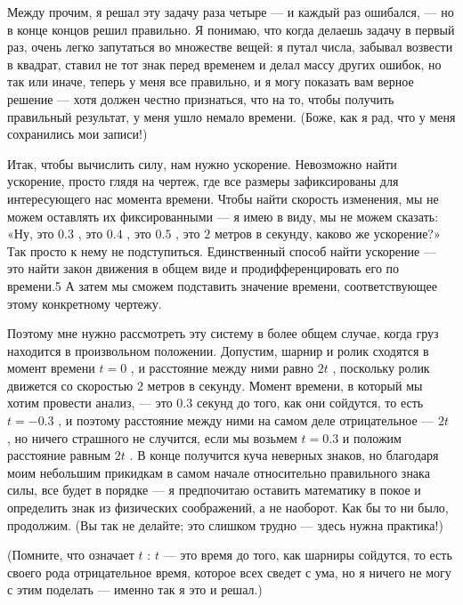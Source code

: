\documentclass[11pt,oneside]{article}
\begin{document}
Между прочим, я решал эту задачу раза четыре --- и каждый раз ошибался, --- но в конце концов решил правильно. Я понимаю, что когда делаешь задачу в первый раз, очень легко запутаться во множестве вещей: я путал числа, забывал возвести в квадрат, ставил не тот знак перед временем и делал массу других ошибок, но так или иначе, теперь у меня все правильно, и я могу показать вам верное решение --- хотя должен честно признаться, что на то, чтобы получить правильный результат, у меня ушло немало времени. (Боже, как я рад, что у меня сохранились мои записи!)\par

Итак, чтобы вычислить силу, нам нужно ускорение. Невозможно найти ускорение, просто глядя на чертеж, где все размеры зафиксированы для интересующего нас момента времени. Чтобы найти скорость изменения, мы не можем оставлять их фиксированными --- я имею в виду, мы не можем сказать: «Ну, это \(0.3\) , это \(0.4\) , это \(0.5\) , это \(2\) метров в секунду, каково же ускорение?» Так просто к нему не подступиться. Единственный способ найти ускорение --- это найти закон движения в общем виде и продифференцировать его по времени.5 А затем мы сможем подставить значение времени, соответствующее этому конкретному чертежу.\par

Поэтому мне нужно рассмотреть эту систему в более общем случае, когда груз находится в произвольном положении. Допустим, шарнир и ролик сходятся в момент времени \(t=0\) , и расстояние между ними равно \(2t\) , поскольку ролик движется со скоростью \(2\) метров в секунду. Момент времени, в который мы хотим провести анализ, --- это \(0.3\) секунд до того, как они сойдутся, то есть \(t=-0.3\) , и поэтому расстояние между ними на самом деле отрицательное --- \(2t\) , но ничего страшного не случится, если мы возьмем \(t=0.3\) и положим расстояние равным \(2t\) . В конце получится куча неверных знаков, но благодаря моим небольшим прикидкам в самом начале относительно правильного знака силы, все будет в порядке --- я предпочитаю оставить математику в покое и определить знак из физических соображений, а не наоборот. Как бы то ни было, продолжим. (Вы так не делайте; это слишком трудно --- здесь нужна практика!)\par

(Помните, что означает \(t\) : \(t\) --- это время до того, как шарниры сойдутся, то есть своего рода отрицательное время, которое всех сведет с ума, но я ничего не могу с этим поделать --- именно так я это и решал.)\par
\end{document}
